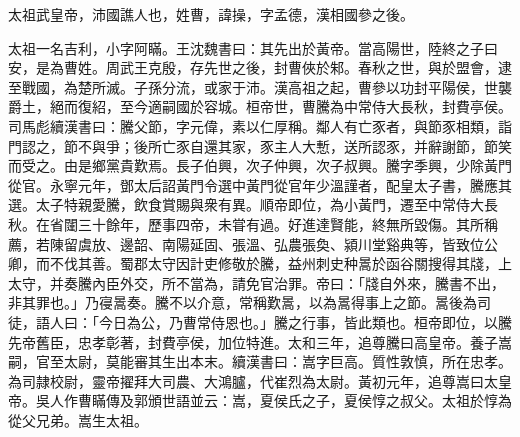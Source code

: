 
\begin{pinyinscope}
太祖武皇帝，沛國譙人也，姓曹，諱操，字孟德，漢相國參之後。

太祖一名吉利，小字阿瞞。王沈魏書曰：其先出於黃帝。當高陽世，陸終之子曰安，是為曹姓。周武王克殷，存先世之後，封曹俠於邾。春秋之世，與於盟會，逮至戰國，為楚所滅。子孫分流，或家于沛。漢高祖之起，曹參以功封平陽侯，世襲爵土，絕而復紹，至今適嗣國於容城。桓帝世，曹騰為中常侍大長秋，封費亭侯。司馬彪續漢書曰：騰父節，字元偉，素以仁厚稱。鄰人有亡豕者，與節豕相類，詣門認之，節不與爭；後所亡豕自還其家，豕主人大慙，送所認豕，并辭謝節，節笑而受之。由是鄉黨貴歎焉。長子伯興，次子仲興，次子叔興。騰字季興，少除黃門從官。永寧元年，鄧太后詔黃門令選中黃門從官年少溫謹者，配皇太子書，騰應其選。太子特親愛騰，飲食賞賜與衆有異。順帝即位，為小黃門，遷至中常侍大長秋。在省闥三十餘年，歷事四帝，未甞有過。好進達賢能，終無所毀傷。其所稱薦，若陳留虞放、邊韶、南陽延固、張溫、弘農張奐、潁川堂谿典等，皆致位公卿，而不伐其善。蜀郡太守因計吏修敬於騰，益州刺史种暠於函谷關搜得其牋，上太守，并奏騰內臣外交，所不當為，請免官治罪。帝曰：「牋自外來，騰書不出，非其罪也。」乃寑暠奏。騰不以介意，常稱歎暠，以為暠得事上之節。暠後為司徒，語人曰：「今日為公，乃曹常侍恩也。」騰之行事，皆此類也。桓帝即位，以騰先帝舊臣，忠孝彰著，封費亭侯，加位特進。太和三年，追尊騰曰高皇帝。養子嵩嗣，官至太尉，莫能審其生出本末。續漢書曰：嵩字巨高。質性敦慎，所在忠孝。為司隷校尉，靈帝擢拜大司農、大鴻臚，代崔烈為太尉。黃初元年，追尊嵩曰太皇帝。吳人作曹瞞傳及郭頒世語並云：嵩，夏侯氏之子，夏侯惇之叔父。太祖於惇為從父兄弟。嵩生太祖。


\end{pinyinscope}
